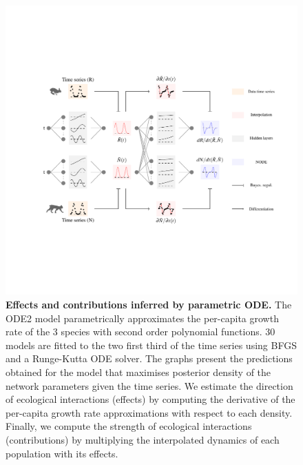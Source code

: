 \documentclass[11pt, oneside]{article}
\begin{document}
\begin{figure}[H]
\includegraphics[width=1\linewidth,page=12]{figures/main.pdf}
\caption{
    \textbf{Effects and contributions inferred by parametric ODE.}
    The ODE2 model parametrically approximates the per-capita growth rate of the 3 species with second order polynomial functions.
    30 models are fitted to the two first third of the time series using BFGS and a Runge-Kutta ODE solver.
    The graphs present the predictions obtained for the model that maximises posterior density of the network parameters given the time series.
    We estimate the direction of ecological interactions (effects) by computing the derivative of the per-capita growth rate approximations with respect to each density.
    Finally, we compute the strength of ecological interactions (contributions) by multiplying the interpolated dynamics of each population with its effects.
}
\end{figure}
\newpage
\end{document}
